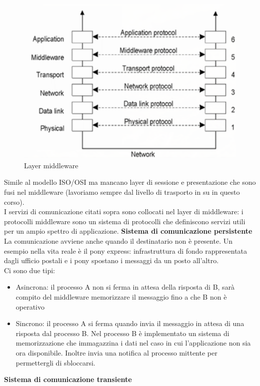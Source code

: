 \documentclass[12pt,italian]{report}
\begin{document}
\begin{figure}[h]
\centering
\includegraphics[width=130mm]{img/middl.png}
\caption{Layer middleware}
\label{fig:middlelayer}
\end{figure}
Simile al modello ISO/OSI ma mancano layer di sessione e presentazione che sono fusi nel middleware (lavoriamo sempre dal livello di trasporto in su in questo corso). \\ I servizi di comunicazione citati sopra sono collocati nel layer di middleware: i protocolli middleware sono un sistema di protocolli che definiscono servizi utili per un ampio spettro di applicazione. 
\bigbreak
\noindent \textbf{Sistema di comunicazione persistente}
\noindent La comunicazione avviene anche quando il destinatario non è presente. Un esempio nella vita reale è il pony express: infrastruttura di fondo rappresentata dagli ufficio postali e i pony spostano i messaggi da un posto all'altro. \\ Ci sono due tipi:
\begin{itemize}
    \item Asincrona: il processo A non si ferma in attesa della risposta di B, sarà compito del middleware memorizzare il messaggio fino a che B non è operativo
    \item Sincrono: il processo A si ferma quando invia il messaggio in attesa di una risposta dal processo B. Nel processo B è implementato un sistema di memorizzazione che immagazzina i dati nel caso in cui l'applicazione non sia ora disponibile. Inoltre invia una notifica al processo mittente per permettergli di sbloccarsi. 
\end{itemize}
\bigbreak
\noindent \textbf{Sistema di comunicazione transiente}
\end{document}
